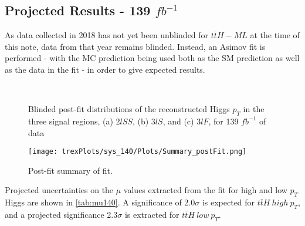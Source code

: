 


\subsection{Projected Results - 139 $fb^{-1}$}   
\label{sec:res140}

As data collected in 2018 has not yet been unblinded for $t\bar{t}H-ML$ at the time of this note, data from that year remains blinded. Instead, an Asimov fit is performed - with the MC prediction being used both as the SM prediction as well as the data in the fit - in order to give expected results.

\begin{figure}[H]
    \centering
    \\
    \caption{Blinded post-fit distributions of the reconstructed Higgs $p_T$ in the three signal regions, (a) $2lSS$, (b) $3lS$, and (c) $3lF$, for 139 $fb^{-1}$ of data}
    \label{fig:sigRegions140}
\end{figure}

\begin{figure}[H]
    \center
    \texttt{[image: trexPlots/sys\_140/Plots/Summary\_postFit.png]}
    \caption{Post-fit summary of fit.}
    \label{fig:Summary140}
\end{figure}

Projected uncertainties on the $\mu$ values extracted from the fit for high and low $p_T$ Higgs are shown in \ref{tab:mu140}. A significance of 2.0$\sigma$ is expected for $t\bar{t}H\ high\ p_T$, and a projected significance 2.3$\sigma$ is extracted for $t\bar{t}H\ low\ p_T$.

